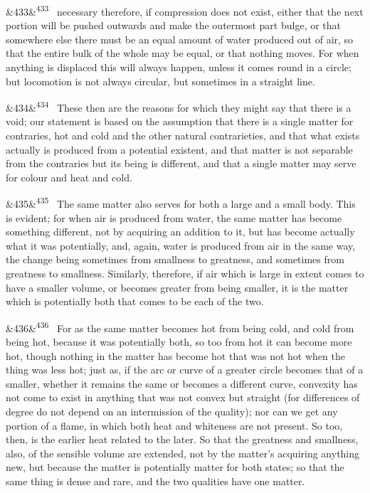 \documentclass[12pt]{article}
\newcommand{\para}[1][]{\par\noindent\ifx&#1&\else\textsuperscript{\footnotesize #1}~\fi}
\begin{document}
\para[433] necessary therefore, if compression does not exist, either that the next portion will be pushed outwards and make the outermost part bulge, or that somewhere else there must be an equal amount of water produced out of air, so that the entire bulk of the whole may be equal, or that nothing moves. For when anything is displaced this will always happen, unless it comes round in a circle; but locomotion is not always circular, but sometimes in a straight line.

\para[434] These then are the reasons for which they might say that there is a void; our statement is based on the assumption that there is a single matter for contraries, hot and cold and the other natural contrarieties, and that what exists actually is produced from a potential existent, and that matter is not separable from the contraries but its being is different, and that a single matter may serve for colour and heat and cold.

\para[435] The same matter also serves for both a large and a small body. This is evident; for when air is produced from water, the same matter has become something different, not by acquiring an addition to it, but has become actually what it was potentially, and, again, water is produced from air in the same way, the change being sometimes from smallness to greatness, and sometimes from greatness to smallness. Similarly, therefore, if air which is large in extent comes to have a smaller volume, or becomes greater from being smaller, it is the matter which is potentially both that comes to be each of the two.

\para[436] For as the same matter becomes hot from being cold, and cold from being hot, because it was potentially both, so too from hot it can become more hot, though nothing in the matter has become hot that was not hot when the thing was less hot; just as, if the arc or curve of a greater circle becomes that of a smaller, whether it remains the same or becomes a different curve, convexity has not come to exist in anything that was not convex but straight (for differences of degree do not depend on an intermission of the quality); nor can we get any portion of a flame, in which both heat and whiteness are not present. So too, then, is the earlier heat related to the later. So that the greatness and smallness, also, of the sensible volume are extended, not by the matter's acquiring anything new, but because the matter is potentially matter for both states; so that the same thing is dense and rare, and the two qualities have one matter.
\end{document}
